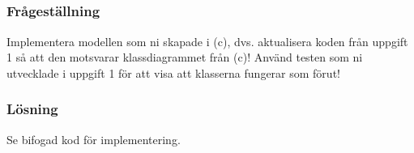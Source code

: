 \subsection{}\label{sec:uppg2d}
\subsubsection*{Frågeställning}
Implementera modellen som ni skapade i (c), dvs. aktualisera koden från
uppgift 1 så att den motsvarar klassdiagrammet från (c)!
Använd testen som ni utvecklade i uppgift 1 för att visa att klasserna fungerar
som förut!

\subsubsection*{Lösning}
Se bifogad kod för implementering.
